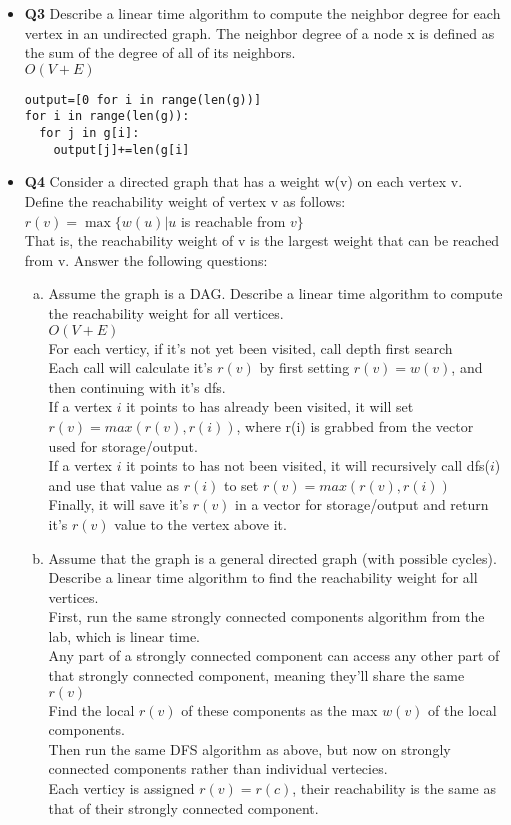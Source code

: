 \documentclass[11pt]{article}
\begin{document}
\begin{itemize}
\item \textbf{Q3} 
Describe a linear time algorithm to compute the neighbor degree for each vertex in an undirected graph. The neighbor degree of a node x is defined as the sum of the degree of all of its neighbors.
\\$O(V+E)$
\begin{verbatim}
output=[0 for i in range(len(g))]
for i in range(len(g)):
  for j in g[i]:
    output[j]+=len(g[i]
\end{verbatim}

\item \textbf{Q4}
Consider a directed graph that has a weight w(v) on each vertex v. Define the reachability weight of vertex v as follows:
\\ $r(v)=\max\{w(u)|u$ is reachable from $v\}$
\\That is, the reachability weight of v is the largest weight that can be reached from v. Answer the following questions:
\begin{enumerate}[(a)]
\item Assume the graph is a DAG. Describe a linear time algorithm to compute the reachability weight for all vertices.
\\$O(V+E)$
\\For each verticy, if it's not yet been visited, call depth first search
\\Each call will calculate it's $r(v)$ by first setting $r(v)=w(v)$, and then continuing with it's dfs. 
\\If a vertex $i$ it points to has already been visited, it will set $r(v)=max(r(v),r(i))$, where r(i) is grabbed from the vector used for storage/output.
\\If a vertex $i$ it points to has not been visited, it will recursively call dfs($i$) and use that value as $r(i)$ to set $r(v)=max(r(v),r(i))$
\\Finally, it will save it's $r(v)$ in a vector for storage/output and return it's $r(v)$ value to the vertex above it.
\item Assume that the graph is a general directed graph (with possible cycles). Describe a linear time algorithm to find the reachability weight for all vertices.
\\First, run the same strongly connected components algorithm from the lab, which is linear time. 
\\Any part of a strongly connected component can access any other part of that strongly connected component, meaning they'll share the same $r(v)$
\\Find the local $r(v)$ of these components as the max $w(v)$ of the local components. 
\\Then run the same DFS algorithm as above, but now on strongly connected components rather than individual vertecies. 
\\Each verticy is assigned $r(v)=r(c)$, their reachability is the same as that of their strongly connected component.
\end{enumerate}

\end{itemize}
\end{document}
